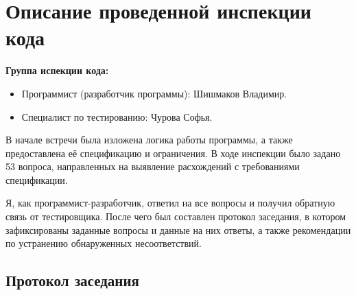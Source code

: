\documentclass{article}[14pt]
\begin{document}
\pagebreak

\section{Описание проведенной инспекции кода}

\noindent \textbf{Группа испекции кода:}

\begin{itemize}
	\item Программист (разработчик программы): Шишмаков Владимир.
	
	\item Специалист по тестированию: Чурова Софья.
\end{itemize}

В начале встречи была изложена логика работы программы, а также предоставлена её спецификацию и ограничения. 
В ходе инспекции было задано 53 вопроса, направленных на выявление расхождений с требованиями спецификации.

Я, как программист-разработчик, ответил на все вопросы и получил обратную связь от тестировщика. После чего был составлен 
протокол заседания, в котором зафиксированы заданные вопросы и данные на них ответы, а также рекомендации по 
устранению обнаруженных несоответствий.

\subsection{Протокол заседания}
\end{document}
